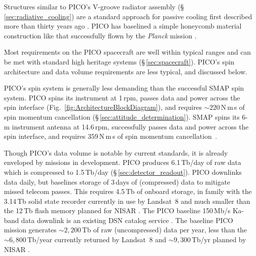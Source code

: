 Structures similar to PICO's V-groove radiator assembly
(\S\,\ref{sec:radiative_cooling}) are a standard approach for passive
cooling first described more than thirty years ago
\citep{Bard1987}.
PICO
has baselined a simple honeycomb material construction like that
successfully flown by the \textit{Planck} mission
\citep{ESA2009,Planck2011}.

Most requirements on the PICO spacecraft are well within typical
ranges and can be met with standard high heritage systems
(\S\,\ref{sec:spacecraft}). PICO's spin architecture and data volume
requirements are less typical, and discussed below.

PICO's spin system is generally less demanding than the successful
SMAP spin system. PICO spins its instrument at 1\,rpm, passes data and
power across the spin interface (Fig.~\ref{fig:ArchitectureBlockDiagram}), and requires $\sim220$\,N\,m\,s of
spin momentum cancellation (\S\,\ref{sec:attitude_determination}). SMAP spins its 6-m instrument
antenna at 14.6\,rpm, successfully passes data and power across the
spin interface, and requires 359\,N\,m\,s of spin momentum cancellation~\citep{Brown2016}.


Though PICO's data volume is notable by current standards, it is
already enveloped by missions in development. PICO produces
6.1\,Tb/day of raw data which is compressed to 1.5\,Tb/day
(\S\,\ref{sec:detector_readout}). PICO downlinks data daily, but
baselines storage of 3\,days of (compressed) data to mitigate missed
telecom passes. This requires 4.5\,Tb of onboard storage, in family
with the 3.14\,Tb solid state recorder currently in use by Landsat~8
and much smaller than the 12\,Tb flash memory planned for NISAR
\citep{Jasper2017}. The PICO baseline 150\,Mb/s Ka-band data downlink
is an existing DSN catalog service \citep{DSN2015}. The
baseline PICO mission generates $\sim2,200$\,Tb of raw (uncompressed)
data per year, less than the $\sim6,800$\,Tb/year currently returned
by Landsat~8 and $\sim 9,300$\,Tb/yr planned by NISAR
\citep{Jasper2017}.

